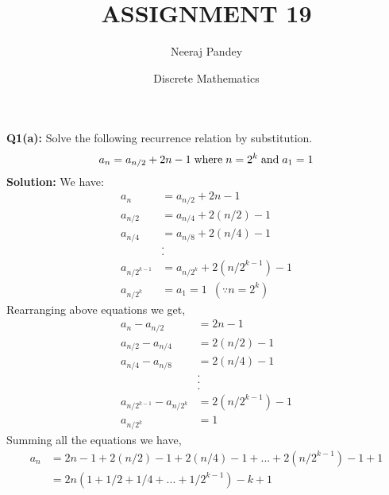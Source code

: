 \documentclass{article}
\title{ASSIGNMENT 19}
\author{Neeraj Pandey}
\date{Discrete Mathematics}
\begin{document}
\maketitle
\begin{flushleft}
    \newcommand\tab[1][1cm]{\hspace*{#1}}
    \textbf{Q1(a): } Solve the following recurrence relation by substitution.
    \[ a_{n} = a_{n/2} + 2n - 1 \tab[0.1cm]\text{where}\tab[0.1cm]{} n=2^k \tab[0.1cm]\text{and}\tab[0.1cm] a_{1} = 1  \]
    \newline
    \newline
    \textbf{Solution: }We have:
    \begin{align*}
        a_n           & =a_{n/2}+2n-1                   \\
        a_{n/2}       & =a_{n/4}+2(n/2)-1               \\
        a_{n/4}       & =a_{n/8}+2(n/4)-1               \\
                      & .                               \\
                      & .                               \\
        a_{n/2^{k-1}} & =a_{n/2^k}+2(n/2^{k-1})-1       \\
        a_{n/2^k}     & =a_1=1\enspace (\because n=2^k)
    \end{align*}
    Rearranging above equations we get,\\
    \begin{align*}
        a_n-a_{n/2}             & =2n-1           \\
        a_{n/2}-a_{n/4}         & =2(n/2)-1       \\
        a_{n/4}-a_{n/8}         & =2(n/4)-1       \\
                                & .               \\
                                & .               \\
                                & .               \\
        a_{n/2^{k-1}}-a_{n/2^k} & =2(n/2^{k-1})-1 \\
        a_{n/2^k}               & =1
    \end{align*}
    Summing all the equations we have,\\
    \begin{align*}
        a_n & =2n-1+2(n/2)-1+2(n/4)-1+...+2(n/2^{k-1})-1+1                                        \\
            & =2n(1+1/2+1/4+...+1/2^{k-1})-k+1                                                    \\

\end{align*}
\end{flushleft}
\end{document}
